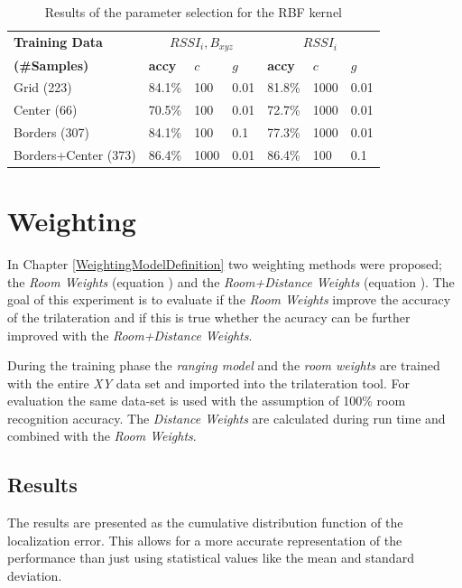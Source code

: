 \begin{table}
\centering
\begin{tabular}{l l l l l l l}
\toprule
\textbf{Training Data}&\multicolumn{3}{c}{\boldmath$RSSI_{i},B_{xyz}$}&\multicolumn{3}{c}{\boldmath$RSSI_{i}$}\\
\textbf{(\#Samples)}&\textbf{accy}&$c$&$g$&\textbf{accy}&$c$&$g$\\
\midrule
Grid (223)&84.1\%&100&0.01&81.8\%&1000&0.01\\
Center (66)&70.5\%&100&0.01&72.7\%&1000&0.01\\
Borders (307)&84.1\%&100&0.1&77.3\%&1000&0.01\\
Borders+Center (373)&86.4\%&1000&0.01&86.4\%&100&0.1\\
\bottomrule
\end{tabular}
\caption[Room Recognition - RBF kernel parameter selection]{Results of the parameter selection for the RBF kernel}
\label{tab:SVMconfigurationRBF}
\end{table}

\section{Weighting}
\label{EvaluationWeighting}

In Chapter \ref{WeightingModelDefinition} two weighting methods were proposed; the \emph{Room Weights} (equation ) and the \emph{Room+Distance Weights} (equation ). The goal of this experiment is to evaluate if the \emph{Room Weights} improve the accuracy of the trilateration and if this is true whether the acuracy can be further improved with the \emph{Room+Distance Weights}.

During the training phase the \emph{ranging model} and the \emph{room weights} are trained with the entire \emph{XY} data set and imported into the trilateration tool. For evaluation the same data-set is used with the assumption of 100\% room recognition accuracy. The \emph{Distance Weights} are calculated during run time and combined with the \emph{Room Weights}.

\subsection{Results}
The results are presented as the cumulative distribution function of the localization error. This allows for a more accurate representation of the performance than just using statistical values like the mean and standard deviation.

